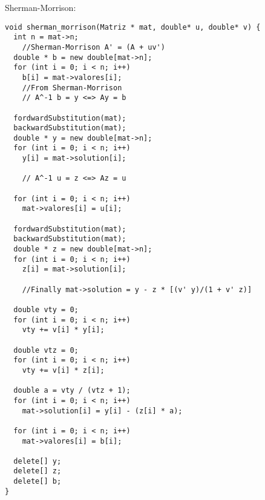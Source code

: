 \documentclass[a4paper]{article}
\begin{document}
Sherman-Morrison:
\begin{lstlisting}
void sherman_morrison(Matriz * mat, double* u, double* v) {
  int n = mat->n;
    //Sherman-Morrison A' = (A + uv')
  double * b = new double[mat->n];
  for (int i = 0; i < n; i++) 
    b[i] = mat->valores[i];
    //From Sherman-Morrison
    // A^-1 b = y <=> Ay = b

  fordwardSubstitution(mat);
  backwardSubstitution(mat);
  double * y = new double[mat->n];
  for (int i = 0; i < n; i++)
    y[i] = mat->solution[i];

    // A^-1 u = z <=> Az = u

  for (int i = 0; i < n; i++)
    mat->valores[i] = u[i];

  fordwardSubstitution(mat);
  backwardSubstitution(mat);
  double * z = new double[mat->n];
  for (int i = 0; i < n; i++)
    z[i] = mat->solution[i];

    //Finally mat->solution = y - z * [(v' y)/(1 + v' z)]

  double vty = 0;
  for (int i = 0; i < n; i++)
    vty += v[i] * y[i];

  double vtz = 0;
  for (int i = 0; i < n; i++)
    vty += v[i] * z[i];

  double a = vty / (vtz + 1);
  for (int i = 0; i < n; i++)
    mat->solution[i] = y[i] - (z[i] * a);

  for (int i = 0; i < n; i++) 
    mat->valores[i] = b[i];

  delete[] y;
  delete[] z;
  delete[] b;
}
\end{lstlisting}
\end{document}
